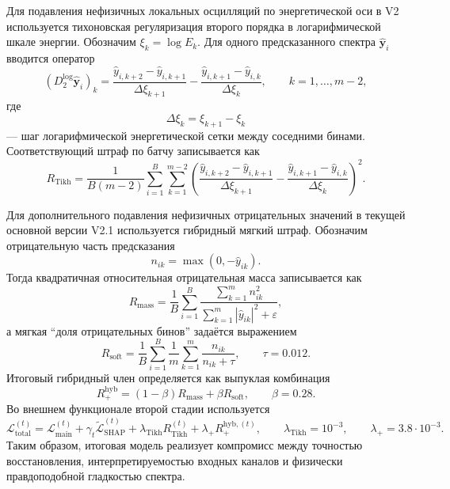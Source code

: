 Для подавления нефизичных локальных осцилляций по энергетической оси в V2 используется тихоновская регуляризация второго порядка в логарифмической шкале энергии. Обозначим $\xi_k=\log E_k$. Для одного предсказанного спектра $\hat{\mathbf{y}}_i$ вводится оператор
\begin{equation}
\left(D^{\log}_2\hat{\mathbf{y}}_i\right)_k =
\frac{\hat{y}_{i,k+2}-\hat{y}_{i,k+1}}{\Delta \xi_{k+1}}
-
\frac{\hat{y}_{i,k+1}-\hat{y}_{i,k}}{\Delta \xi_k},
\qquad k=1,\dots,m-2,
\end{equation}
где
\begin{equation}
\Delta \xi_k = \xi_{k+1}-\xi_k
\end{equation}
--- шаг логарифмической энергетической сетки между соседними бинами. Соответствующий штраф по батчу записывается как
\begin{equation}
R_{\mathrm{Tikh}} = \frac{1}{B(m-2)}\sum_{i=1}^{B}\sum_{k=1}^{m-2}
\left(
\frac{\hat{y}_{i,k+2}-\hat{y}_{i,k+1}}{\Delta \xi_{k+1}}
-
\frac{\hat{y}_{i,k+1}-\hat{y}_{i,k}}{\Delta \xi_k}
\right)^2.
\end{equation}

Для дополнительного подавления нефизичных отрицательных значений в текущей основной версии V2.1 используется гибридный мягкий штраф. Обозначим отрицательную часть предсказания
\begin{equation}
n_{ik} = \max(0,-\hat{y}_{ik}).
\end{equation}
Тогда квадратичная относительная отрицательная масса записывается как
\begin{equation}
R_{\mathrm{mass}} =
\frac{1}{B}\sum_{i=1}^{B}
\frac{\sum_{k=1}^{m} n_{ik}^{2}}{\sum_{k=1}^{m}|\hat{y}_{ik}|^{2}+\varepsilon},
\end{equation}
а мягкая ``доля отрицательных бинов'' задаётся выражением
\begin{equation}
R_{\mathrm{soft}} =
\frac{1}{B}\sum_{i=1}^{B}\frac{1}{m}\sum_{k=1}^{m}
\frac{n_{ik}}{n_{ik}+\tau},
\qquad \tau = 0.012.
\end{equation}
Итоговый гибридный член определяется как выпуклая комбинация
\begin{equation}
R_{+}^{\mathrm{hyb}} = (1-\beta)R_{\mathrm{mass}} + \beta R_{\mathrm{soft}},
\qquad \beta = 0.28.
\end{equation}
Во внешнем функционале второй стадии используется
\begin{equation}
\mathcal{L}_{\mathrm{total}}^{(t)} = \mathcal{L}_{\mathrm{main}}^{(t)} + \gamma_t \widetilde{\mathcal{L}}_{\mathrm{SHAP}}^{(t)} + \lambda_{\mathrm{Tikh}} R_{\mathrm{Tikh}}^{(t)} + \lambda_{+}R_{+}^{\mathrm{hyb},(t)},
\qquad
\lambda_{\mathrm{Tikh}} = 10^{-3},
\qquad
\lambda_{+}=3.8\cdot 10^{-3}.
\end{equation}
Таким образом, итоговая модель реализует компромисс между точностью восстановления, интерпретируемостью входных каналов и физически правдоподобной гладкостью спектра.

